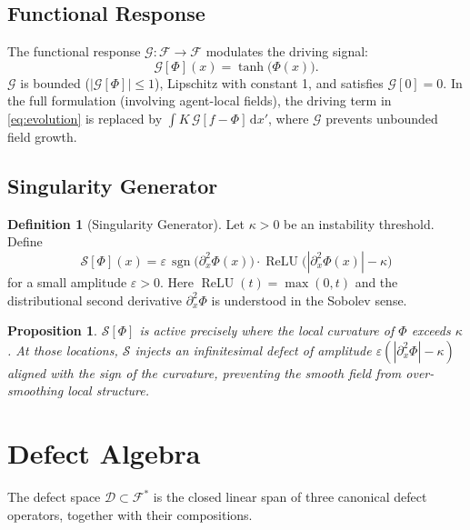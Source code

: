 \documentclass[12pt,a4paper]{article}
\theoremstyle{plain}
\newtheorem{proposition}[theorem]{Proposition}
\theoremstyle{definition}
\newtheorem{definition}[theorem]{Definition}
\theoremstyle{remark}
\newcommand{\cF}{\mathcal{F}}
\newcommand{\cD}{\mathcal{D}}
\newcommand{\cG}{\mathcal{G}}
\newcommand{\cS}{\mathcal{S}}
\newcommand{\abs}[1]{\left|#1\right|}
\newcommand{\dd}{\mathrm{d}}
\newcommand{\eps}{\varepsilon}
\DeclareMathOperator{\sgn}{sgn}
\DeclareMathOperator{\ReLU}{ReLU}
\begin{document}
\subsection{Functional Response}
\label{sec:theory:response}

The functional response $\cG : \cF \to \cF$ modulates the
driving signal:
\begin{equation}
  \cG[\Phi](x) = \tanh\!\bigl(\Phi(x)\bigr).
  \label{eq:response}
\end{equation}
$\cG$ is bounded ($|\cG[\Phi]| \leq 1$), Lipschitz with constant 1,
and satisfies $\cG[0] = 0$.  In the full formulation
(involving agent-local fields), the driving term in \eqref{eq:evolution}
is replaced by $\int K\,\cG[f - \Phi]\,\dd x'$, where
$\cG$ prevents unbounded field growth.

\subsection{Singularity Generator}
\label{sec:theory:singularity}

\begin{definition}[Singularity Generator]
  Let $\kappa > 0$ be an instability threshold.  Define
  \begin{equation}
    \cS[\Phi](x)
    = \eps\,\sgn\!\bigl(\partial^2_x \Phi(x)\bigr)
      \cdot \ReLU\!\bigl(\abs{\partial^2_x \Phi(x)} - \kappa\bigr)
    \label{eq:singularity}
  \end{equation}
  for a small amplitude $\eps > 0$.
  Here $\ReLU(t) = \max(0,t)$ and the distributional second derivative
  $\partial^2_x \Phi$ is understood in the Sobolev sense.
\end{definition}

\begin{proposition}
  $\cS[\Phi]$ is active precisely where the local curvature of $\Phi$
  exceeds $\kappa$.  At those locations, $\cS$ injects an infinitesimal
  defect of amplitude $\eps(\abs{\partial^2_x\Phi} - \kappa)$
  aligned with the sign of the curvature, preventing the smooth field
  from over-smoothing local structure.
\end{proposition}

\section{Defect Algebra}
\label{sec:defect}

The defect space $\cD \subset \cF^*$ is the closed linear span of
three canonical defect operators, together with their compositions.
\end{document}
